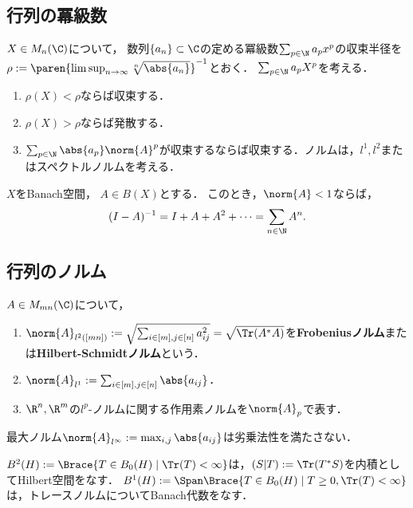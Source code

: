 \documentclass[uplatex, dvipdfmx]{jsreport}
\begin{document}
\subsection{行列の冪級数}

\begin{theorem}[行列の冪級数の収束半径]
    $X\in M_n(\C)$について，
    数列$\{a_n\}\subset\C$の定める冪級数$\sum_{p\in\N}a_px^p$の収束半径を$\rho:=\paren{\limsup_{n\to\infty}\sqrt[n]{\abs{a_n}}}^{-1}$とおく．
    $\sum_{p\in\N}a_pX^p$を考える．
    \begin{enumerate}
        \item $\rho(X)<\rho$ならば収束する．
        \item $\rho(X)>\rho$ならば発散する．
        \item $\sum_{p\in\N}\abs{a_p}\norm{A}^p$が収束するならば収束する．ノルムは，$l^1,l^2$またはスペクトルノルムを考える．
    \end{enumerate}
\end{theorem}

\begin{theorem}
    $X$をBanach空間，
    $A\in B(X)$とする．
    このとき，$\norm{A}<1$ならば，
    \[(I-A)^{-1}=I+A+A^2+\cdots=\sum_{n\in\N}A^n.\]
\end{theorem}

\subsection{行列のノルム}

\begin{definition}
    $A\in M_{mn}(\C)$について，
    \begin{enumerate}
        \item $\norm{A}_{l^2([mn])}:=\sqrt{\sum_{i\in[m],j\in[n]}a_{ij}^2}=\sqrt{\Tr(A^*A)}$を\textbf{Frobeniusノルム}または\textbf{Hilbert-Schmidtノルム}という．
        \item $\norm{A}_{l^1}:=\sum_{i\in[m],j\in[n]}\abs{a_{ij}}$．
        \item $\R^n,\R^m$の$l^p$-ノルムに関する作用素ノルムを$\norm{A}_p$で表す．
    \end{enumerate}
\end{definition}
\begin{remark}
    最大ノルム$\norm{A}_{l^\infty}:=\max_{i,j}\abs{a_{ij}}$は劣乗法性を満たさない．
\end{remark}
\begin{remarks}
    $B^2(H):=\Brace{T\in B_0(H)\mid\Tr(T)<\infty}$は，$(S|T):=\Tr(T^*S)$を内積としてHilbert空間をなす．
    $B^1(H):=\Span\Brace{T\in B_0(H)\mid T\ge0,\Tr(T)<\infty}$は，トレースノルムについてBanach代数をなす．
\end{remarks}
\end{document}
